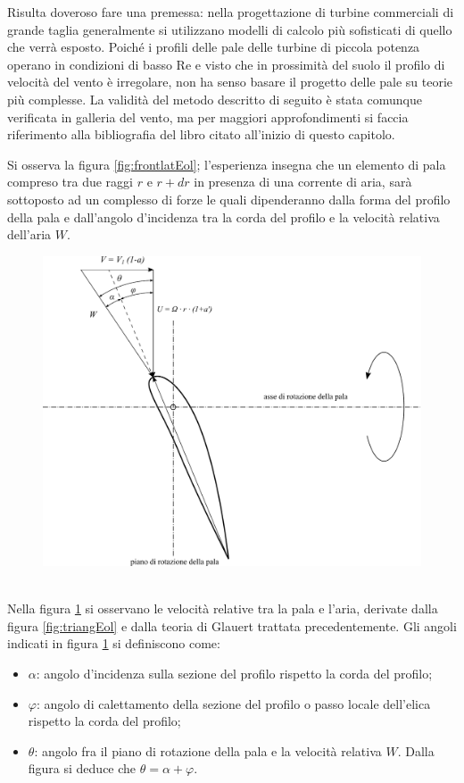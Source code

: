 Risulta doveroso fare una premessa: nella progettazione di turbine commerciali di grande taglia generalmente si utilizzano modelli di calcolo più sofisticati di quello che verrà esposto.
Poiché i profili delle pale delle turbine di piccola potenza operano in condizioni di basso Re e visto che in prossimità del suolo il profilo di velocità del vento è irregolare, non ha senso basare il progetto delle pale su teorie più complesse. La validità del metodo descritto di seguito è stata comunque verificata in galleria del vento, ma per maggiori approfondimenti si faccia riferimento alla bibliografia del libro citato all'inizio di questo capitolo.

Si osserva la figura \ref{fig:frontlatEol}; l'esperienza insegna che un elemento di pala compreso tra due raggi $r$ e $r+dr$ in presenza di una corrente di aria, sarà sottoposto ad un complesso di forze le quali dipenderanno dalla forma del profilo della pala e dall'angolo d'incidenza tra la corda del profilo e la velocità relativa dell'aria $W$.
\begin{figure}[h!]
\centering
  \includegraphics[width=.7\textwidth]{fig/triangEol2.pdf}
\caption{}
\label{fig:triangEol2}
\end{figure}
\\ Nella figura \ref{fig:triangEol2} si osservano le velocità relative tra la pala e l'aria, derivate dalla figura \ref{fig:triangEol} e dalla teoria di Glauert trattata precedentemente. Gli angoli indicati in figura \ref{fig:triangEol2} si definiscono come:
\begin{itemize}
	\item $\alpha$: angolo d'incidenza sulla sezione del profilo rispetto la corda del profilo;
	\item $\varphi$: angolo di calettamento della sezione del profilo o passo locale dell'elica rispetto la corda del profilo;
	\item $\theta$: angolo fra il piano di rotazione della pala e la velocità relativa $W$. Dalla figura si deduce che $\theta = \alpha + \varphi$.
\end{itemize}
